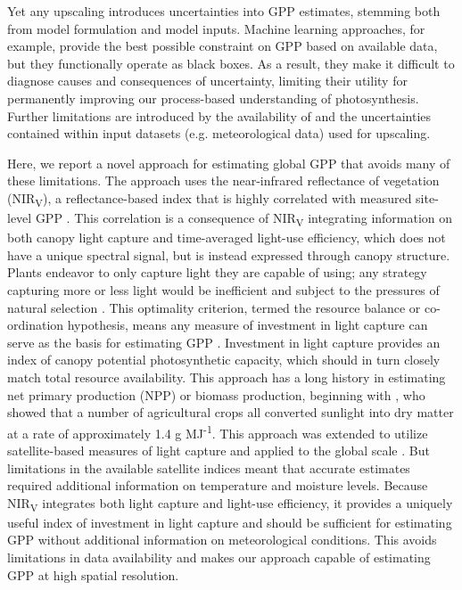 \documentclass[10pt,letterpaper]{article}
\begin{document}
Yet any upscaling introduces uncertainties into GPP estimates, stemming both from model formulation and model inputs. Machine learning approaches, for example, provide the best possible constraint on GPP based on available data, but they functionally operate as black boxes. As a result, they  make it difficult to diagnose causes and consequences of uncertainty, limiting their utility for permanently improving our process-based understanding of photosynthesis. Further limitations are introduced by the availability of and the uncertainties contained within input datasets (e.g. meteorological data) used for upscaling. 

Here, we report a novel approach for estimating global GPP that avoids many of these limitations. The approach uses the near-infrared reflectance of vegetation (NIR\textsubscript{V}), a reflectance-based index that is highly correlated with measured site-level GPP \cite{Badgley2017}. This correlation is a consequence of NIR\textsubscript{V} integrating information on both canopy light capture and time-averaged light-use efficiency, which does not have a unique spectral signal, but is instead expressed  through canopy structure. Plants endeavor to only capture light they are capable of using; any strategy capturing more or less light would be inefficient and subject to the pressures of natural selection \cite{Bloom1985}.  This optimality criterion, termed the resource balance or co-ordination hypothesis, means any measure of investment in light capture can serve as the basis for estimating GPP \cite{Field1991, Marie2012}. Investment in light capture provides an index of canopy potential photosynthetic capacity, which should in turn closely match total resource availability. This approach has a long history in estimating net primary production (NPP) or biomass production, beginning with \citet{monteith1977}, who showed that a number of agricultural crops all converted sunlight into dry matter at a rate of approximately 1.4 g MJ\textsuperscript{-1}. This approach was extended to utilize satellite-based measures of light capture and applied to the global scale \cite{Potter1993, Field1995}. But limitations in the available satellite indices meant that accurate estimates required additional information on temperature and moisture levels. Because NIR\textsubscript{V} integrates both light capture and light-use efficiency, it provides a uniquely useful index of investment in light capture and should be sufficient for estimating GPP without additional information on meteorological conditions.  This avoids limitations in data availability and makes our approach capable of estimating GPP at high spatial resolution.  
\end{document}
